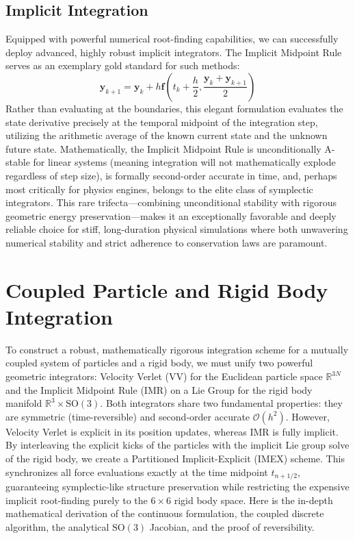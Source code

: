 \subsection{Implicit Integration}
Equipped with powerful numerical root-finding capabilities, we can successfully deploy advanced, highly robust implicit integrators. The Implicit Midpoint Rule serves as an exemplary gold standard for such methods:
\begin{equation}
    \bm{y}_{k+1} = \bm{y}_k + h \bm{f}\left(t_k + \frac{h}{2}, \frac{\bm{y}_k + \bm{y}_{k+1}}{2}\right)
\end{equation}
Rather than evaluating at the boundaries, this elegant formulation evaluates the state derivative precisely at the temporal midpoint of the integration step, utilizing the arithmetic average of the known current state and the unknown future state. Mathematically, the Implicit Midpoint Rule is unconditionally A-stable for linear systems (meaning integration will not mathematically explode regardless of step size), is formally second-order accurate in time, and, perhaps most critically for physics engines, belongs to the elite class of symplectic integrators. This rare trifecta—combining unconditional stability with rigorous geometric energy preservation—makes it an exceptionally favorable and deeply reliable choice for stiff, long-duration physical simulations where both unwavering numerical stability and strict adherence to conservation laws are paramount.

\section{Coupled Particle and Rigid Body Integration}

To construct a robust, mathematically rigorous integration scheme for a mutually coupled system of particles and a rigid body, we must unify two powerful geometric integrators: Velocity Verlet (VV) for the Euclidean particle space $\mathbb{R}^{3N}$ and the Implicit Midpoint Rule (IMR) on a Lie Group for the rigid body manifold $\mathbb{R}^3 \times \text{SO}(3)$. Both integrators share two fundamental properties: they are symmetric (time-reversible) and second-order accurate $\mathcal{O}(h^2)$. However, Velocity Verlet is explicit in its position updates, whereas IMR is fully implicit. By interleaving the explicit kicks of the particles with the implicit Lie group solve of the rigid body, we create a Partitioned Implicit-Explicit (IMEX) scheme. This synchronizes all force evaluations exactly at the time midpoint $t_{n+1/2}$, guaranteeing symplectic-like structure preservation while restricting the expensive implicit root-finding purely to the $6 \times 6$ rigid body space. Here is the in-depth mathematical derivation of the continuous formulation, the coupled discrete algorithm, the analytical $\text{SO}(3)$ Jacobian, and the proof of reversibility.

